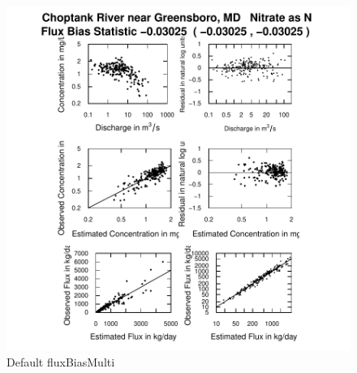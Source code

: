 \documentclass[a4paper,11pt]{article}
\begin{document}
\begin{figure}[ht]
\begin{center}

\includegraphics{EGRET-figfluxBiasMulti}
\end{center}
\caption{Default fluxBiasMulti}
\label{fig:fluxBiasMulti}
\end{figure}
\end{document}
